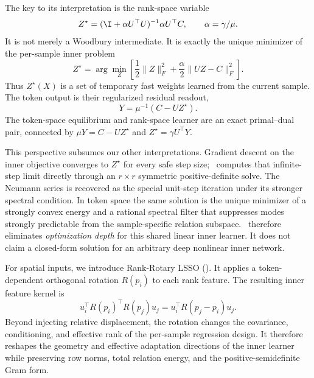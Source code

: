 The key to its interpretation is the rank-space variable
\begin{equation}
  Z^\star
  =(\I+\alpha U^\top U)^{-1}\alpha U^\top C,
  \qquad \alpha=\gamma/\mu.
  \label{eq:fast_weights_intro}
\end{equation}
It is not merely a Woodbury intermediate. It is exactly the unique minimizer
of the per-sample inner problem
\begin{equation}
  Z^\star
  =\arg\min_Z
  \left[
    \frac12\lVert Z\rVert_F^2
    +\frac{\alpha}{2}\lVert UZ-C\rVert_F^2
  \right].
  \label{eq:inner_intro}
\end{equation}
Thus $Z^\star(X)$ is a set of temporary fast weights learned from the current
sample. The token output is their regularized residual readout,
\begin{equation}
  Y=\mu^{-1}(C-UZ^\star).
  \label{eq:residual_intro}
\end{equation}
The token-space equilibrium and rank-space learner are an exact primal--dual
pair, connected by $\mu Y=C-UZ^\star$ and
$Z^\star=\gamma U^\top Y$.

This perspective subsumes our other interpretations. Gradient descent on the
inner objective converges to $Z^\star$ for every safe step size; \LSSO\ computes
that infinite-step limit directly through an $r\times r$ symmetric
positive-definite solve. The Neumann series is recovered as the special
unit-step iteration under its stronger spectral condition. In token space the
same solution is the unique minimizer of a strongly convex energy and a
rational spectral filter that suppresses modes strongly predictable from the
sample-specific relation subspace. \LSSO\ therefore eliminates
\emph{optimization depth} for this shared linear inner learner. It does not
claim a closed-form solution for an arbitrary deep nonlinear inner network.

For spatial inputs, we introduce Rank-Rotary LSSO (\RRLSSO). It applies a
token-dependent orthogonal rotation $R(p_i)$ to each rank feature. The resulting
inner feature kernel is
\[
  u_i^\top R(p_i)^\top R(p_j)u_j
  =u_i^\top R(p_j-p_i)u_j.
\]
Beyond injecting relative displacement, the rotation changes the covariance,
conditioning, and effective rank of the per-sample regression design. It
therefore reshapes the geometry and effective adaptation directions of the
inner learner while preserving row norms, total relation energy, and the
positive-semidefinite Gram form.

